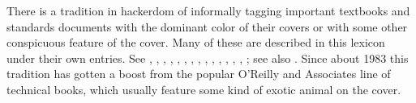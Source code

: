 
There is a tradition in hackerdom of informally tagging important textbooks and
standards documents with the dominant color of their covers or with some other
conspicuous feature of the cover. Many of these are described in this lexicon
under their own entries. See , ,
, , ,
, , ,
, , ,
, , ,
; see also . Since about 1983 this
tradition has gotten a boost from the popular O'Reilly and Associates line of
technical books, which usually feature some kind of exotic animal on the cover.

